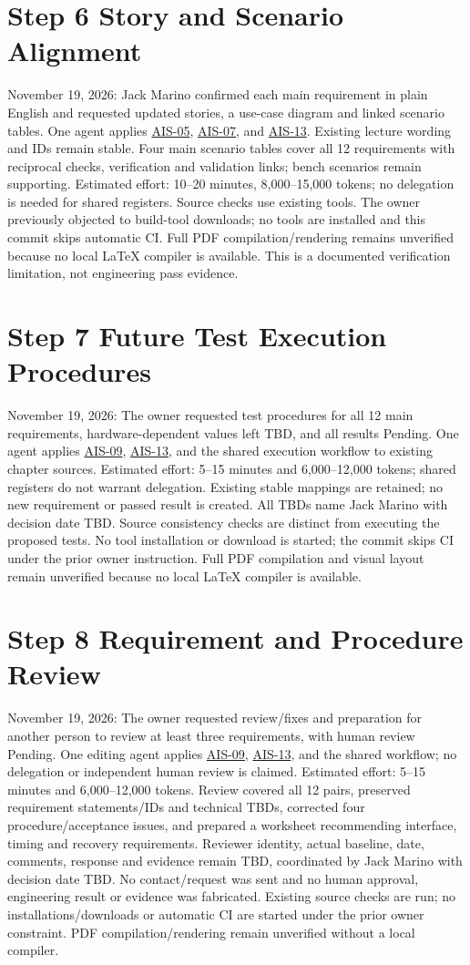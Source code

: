 \section{Step 6 Story and Scenario Alignment}
November 19, 2026: Jack Marino confirmed each main requirement in plain English and requested updated stories, a use-case diagram and linked scenario tables. One agent applies \hyperref[Skill:AIS-05]{AIS-05}, \hyperref[Skill:AIS-07]{AIS-07}, and \hyperref[Skill:AIS-13]{AIS-13}. Existing lecture wording and IDs remain stable. Four main scenario tables cover all 12 requirements with reciprocal checks, verification and validation links; bench scenarios remain supporting. Estimated effort: 10--20 minutes, 8,000--15,000 tokens; no delegation is needed for shared registers. Source checks use existing tools. The owner previously objected to build-tool downloads; no tools are installed and this commit skips automatic CI. Full PDF compilation/rendering remains unverified because no local LaTeX compiler is available. This is a documented verification limitation, not engineering pass evidence.
\section{Step 7 Future Test Execution Procedures}
November 19, 2026: The owner requested test procedures for all 12 main requirements, hardware-dependent values left TBD, and all results Pending. One agent applies \hyperref[Skill:AIS-09]{AIS-09}, \hyperref[Skill:AIS-13]{AIS-13}, and the shared execution workflow to existing chapter sources. Estimated effort: 5--15 minutes and 6,000--12,000 tokens; shared registers do not warrant delegation. Existing stable mappings are retained; no new requirement or passed result is created. All TBDs name Jack Marino with decision date TBD. Source consistency checks are distinct from executing the proposed tests. No tool installation or download is started; the commit skips CI under the prior owner instruction. Full PDF compilation and visual layout remain unverified because no local LaTeX compiler is available.
\section{Step 8 Requirement and Procedure Review}
November 19, 2026: The owner requested review/fixes and preparation for another person to review at least three requirements, with human review Pending. One editing agent applies \hyperref[Skill:AIS-09]{AIS-09}, \hyperref[Skill:AIS-13]{AIS-13}, and the shared workflow; no delegation or independent human review is claimed. Estimated effort: 5--15 minutes and 6,000--12,000 tokens. Review covered all 12 pairs, preserved requirement statements/IDs and technical TBDs, corrected four procedure/acceptance issues, and prepared a worksheet recommending interface, timing and recovery requirements. Reviewer identity, actual baseline, date, comments, response and evidence remain TBD, coordinated by Jack Marino with decision date TBD. No contact/request was sent and no human approval, engineering result or evidence was fabricated. Existing source checks are run; no installations/downloads or automatic CI are started under the prior owner constraint. PDF compilation/rendering remain unverified without a local compiler.
